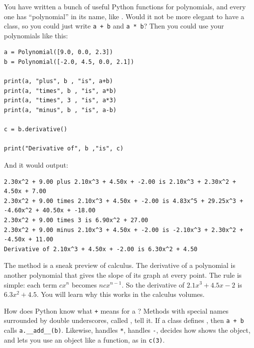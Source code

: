You have written a bunch of useful Python functions for polynomials, and
every one has ``polynomial'' in its name, like
. Would it not be more elegant to have a
 class, so you could just write \texttt{a + b} and
\texttt{a * b}? Then you could use your polynomials like this:
\begin{verbatim}
a = Polynomial([9.0, 0.0, 2.3])
b = Polynomial([-2.0, 4.5, 0.0, 2.1])

print(a, "plus", b , "is", a+b)
print(a, "times", b , "is", a*b)
print(a, "times", 3 , "is", a*3)
print(a, "minus", b , "is", a-b)

c = b.derivative()

print("Derivative of", b ,"is", c)
\end{verbatim}

And it would output:
\begin{verbatim}
2.30x^2 + 9.00 plus 2.10x^3 + 4.50x + -2.00 is 2.10x^3 + 2.30x^2 + 4.50x + 7.00
2.30x^2 + 9.00 times 2.10x^3 + 4.50x + -2.00 is 4.83x^5 + 29.25x^3 + -4.60x^2 + 40.50x + -18.00
2.30x^2 + 9.00 times 3 is 6.90x^2 + 27.00
2.30x^2 + 9.00 minus 2.10x^3 + 4.50x + -2.00 is -2.10x^3 + 2.30x^2 + -4.50x + 11.00
Derivative of 2.10x^3 + 4.50x + -2.00 is 6.30x^2 + 4.50
\end{verbatim}

The  method is a sneak preview of calculus. The
derivative of a polynomial is another polynomial that gives the slope of
its graph at every point. The rule is simple: each term $cx^n$ becomes
$ncx^{n-1}$. So the derivative of $2.1x^3 + 4.5x - 2$ is $6.3x^2 + 4.5$.
You will learn why this works in the calculus volumes.

How does Python know what \texttt{+} means for a ?
Methods with special names surrounded by double underscores, called
, tell it. If a class defines
, then \texttt{a + b} calls
\texttt{a.\_\_add\_\_(b)}. Likewise,  handles
\texttt{*},  handles \texttt{-},
 decides how  shows the object,
and  lets you use an object like a function,
as in \texttt{c(3)}.

